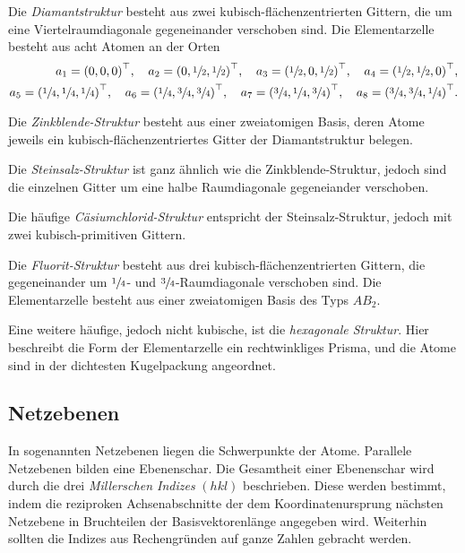 Die \textit{Diamantstruktur} besteht aus zwei kubisch-flächenzentrierten Gittern,
die um eine Viertelraumdiagonale gegeneinander verschoben sind.
Die Elementarzelle besteht aus acht Atomen an der Orten
\begin{align*}
  a_1 = {\left(0, 0, 0\right)}^\top, \hspace{1em}
  a_2 = {\left(0, \sfrac{1}{2}, \sfrac{1}{2}\right)}^\top, \hspace{1em}
  a_3 = {\left(\sfrac{1}{2}, 0, \sfrac{1}{2}\right)}^\top, \hspace{1em}
  a_4 = {\left(\sfrac{1}{2}, \sfrac{1}{2}, 0\right)}^\top, \\
  a_5 = {\left(\sfrac{1}{4}, \sfrac{1}{4}, \sfrac{1}{4}\right)}^\top, \hspace{1em}
  a_6 = {\left(\sfrac{1}{4}, \sfrac{3}{4}, \sfrac{3}{4}\right)}^\top, \hspace{1em}
  a_7 = {\left(\sfrac{3}{4}, \sfrac{1}{4}, \sfrac{3}{4}\right)}^\top, \hspace{1em}
  a_8 = {\left(\sfrac{3}{4}, \sfrac{3}{4}, \sfrac{1}{4}\right)}^\top.
\end{align*}

Die \textit{Zinkblende-Struktur} besteht aus einer zweiatomigen Basis,
deren Atome jeweils ein kubisch-flächenzentriertes Gitter
der Diamantstruktur belegen.

Die \textit{Steinsalz-Struktur} ist ganz ähnlich wie die Zinkblende-Struktur,
jedoch sind die einzelnen Gitter um eine halbe Raumdiagonale gegeneiander verschoben.

Die häufige \textit{Cäsiumchlorid-Struktur} entspricht der Steinsalz-Struktur,
jedoch mit zwei kubisch-primitiven Gittern.

Die \textit{Fluorit-Struktur} besteht aus drei kubisch-flächenzentrierten Gittern,
die gegeneinander um $\sfrac{1}{4}$- und $\sfrac{3}{4}$-Raumdiagonale verschoben sind.
Die Elementarzelle besteht aus einer zweiatomigen Basis des Typs $AB_2$.

Eine weitere häufige, jedoch nicht kubische, ist die \textit{hexagonale Struktur}.
Hier beschreibt die Form der Elementarzelle ein rechtwinkliges Prisma,
und die Atome sind in der dichtesten Kugelpackung angeordnet.

\subsection{Netzebenen}
In sogenannten Netzebenen liegen die Schwerpunkte der Atome.
Parallele Netzebenen bilden eine Ebenenschar.
Die Gesamtheit einer Ebenenschar wird durch die drei
\textit{Millerschen Indizes} $\left(hkl\right)$ beschrieben.
Diese werden bestimmt, indem die reziproken Achsenabschnitte
der dem Koordinatenursprung nächsten Netzebene in Bruchteilen der
Basisvektorenlänge angegeben wird.
Weiterhin sollten die Indizes aus Rechengründen auf ganze Zahlen gebracht werden.


